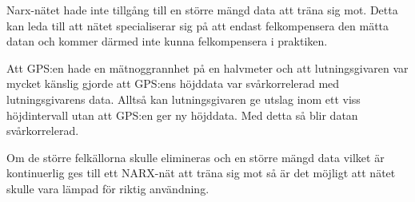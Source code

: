 {Narx-nätet hade inte tillgång till en större mängd data att träna sig mot. Detta kan leda till att nätet specialiserar sig på att endast felkompensera den mätta datan och kommer därmed inte kunna felkompensera i praktiken.

Att GPS:en hade en mätnoggrannhet på en halvmeter och att lutningsgivaren var mycket känslig gjorde att GPS:ens höjddata var svårkorrelerad med lutningsgivarens data. Alltså kan lutningsgivaren ge utslag inom ett viss höjdintervall utan att GPS:en ger ny höjddata. Med detta så blir datan svårkorrelerad.

Om de större felkällorna skulle elimineras och en större mängd data vilket är kontinuerlig ges till ett NARX-nät att träna sig mot så är det möjligt att nätet skulle vara lämpad för riktig användning.

}
